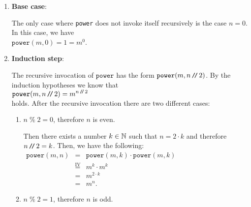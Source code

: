 \begin{enumerate}
\item \textbf{Base case}:

      The only case where \texttt{power} does not invoke itself recursively is the case $n = 0$.  
      In this case, we have
      \\[0.2cm]
      \hspace*{1.3cm} 
      $\mathtt{power}(m,0) = 1 =  m^0$.
\item \textbf{Induction step}:

      The recursive invocation of $\mathtt{power}$ has the form
      $\mathtt{power}(m,n \mbox{\,\texttt{/}$\!$\texttt{/}\,} 2)$.  By the induction hypotheses we know that 
      \\[0.2cm]
      \hspace*{1.3cm}
      $\displaystyle \mathtt{power}(m,n \mbox{\,\texttt{/}$\!$\texttt{/}\,} 2) = m^{n \mbox{\scriptsize\,\texttt{/}$\!$\texttt{/}\,} 2}$ 
      \\[0.2cm]
      holds.  After the recursive invocation there are two different cases:
      \begin{enumerate}
      \item $n \;\texttt{\%}\; 2 = 0$, therefore $n$ is even.

            Then there exists a number $k \in {\mathbb N}$ such that $n = 2 \cdot k$ and therefore
            $n \mbox{\,\texttt{/}$\!$\texttt{/}\,} 2 = k$.
            Then, we have the following:
            \\[0.2cm]
            \hspace*{1.3cm}
           $ 
            \begin{array}{lcl}
            \mathtt{power}(m,n) & = & \mathtt{power}(m,k) \cdot \mathtt{power}(m,k) \\[0.2cm]
                                & \stackrel{\mathrm{IV}}{=} & m^k \cdot m^k  \\[0.2cm]
                                & = & m^{2\cdot k} \\[0.2cm]
                                & = & m^{n}.
            \end{array}
            $            
      \item $n \;\texttt{\%}\; 2 = 1$, therefore $n$ is odd.


\end{enumerate}
\end{enumerate}
